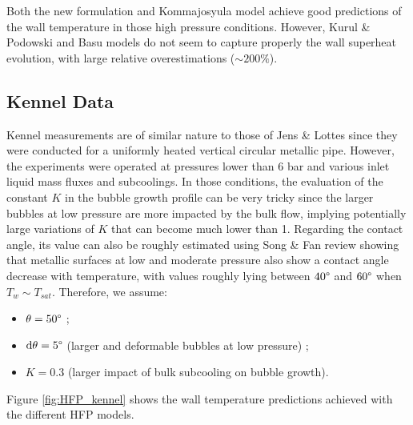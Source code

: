 \npar

Both the new formulation and Kommajosyula model achieve good predictions of the wall temperature in those high pressure conditions. However, Kurul \& Podowski and Basu models do not seem to capture properly the wall superheat evolution, with large relative overestimations ($\sim 200\%$).


\subsection{Kennel Data}
\label{subsec:HFP_verif_kennel}

Kennel measurements are of similar nature to those of Jens \& Lottes since they were conducted for a uniformly heated vertical circular metallic pipe. However, the experiments were operated at pressures lower than 6 bar and various inlet liquid mass fluxes and subcoolings. In those conditions, the evaluation of the constant $K$ in the bubble growth profile can be very tricky since the larger bubbles at low pressure are more impacted by the bulk flow, implying potentially large variations of $K$ that can become much lower than 1. Regarding the contact angle, its value can also be roughly estimated using Song \& Fan review \cite{song_temperature_2021} showing that metallic surfaces at low and moderate pressure also show a contact angle decrease with temperature, with values roughly lying between $40 \degree$ and $60 \degree$ when $T_{w} \sim T_{sat}$. Therefore, we assume:


\begin{itemize}
\item $\theta = 50 \degree$ ;
\item $\mathrm{d}\theta = 5 \degree$ (larger and deformable bubbles at low pressure) ;
\item $K = 0.3$ (larger impact of bulk subcooling on bubble growth).
\end{itemize}



\npar



Figure \ref{fig:HFP_kennel} shows the wall temperature predictions achieved with the different HFP models.

